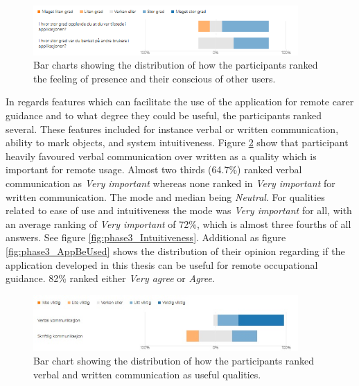 \begin{figure}[H]
  \centering
   \captionsetup{width=.8\linewidth}
    \includegraphics[width=0.9\textwidth]{fig/phase_3/survey/socialPrecense.png}
 \caption{Bar charts showing the distribution of how the participants ranked the feeling of presence and their 
conscious of other users.}
\label{fig:phase3_socialPresence}
\end{figure}


In regards features which can facilitate the use of the application for remote carer guidance and to what degree they could be useful, the participants ranked several. These features included for instance verbal or written communication, ability to mark objects, and system intuitiveness. Figure \ref{fig:phase3_VerbalWritten} show that participant heavily favoured verbal communication over written as a quality which is important for remote usage. Almost two thirds (64.7\%) ranked verbal communication as \textit{Very important} whereas none ranked in \textit{Very important} for written communication. The mode and median being \textit{Neutral}.
For qualities related to ease of use and intuitiveness the mode was \textit{Very important} for all, with an average ranking of \textit{Very important} of 72\%, which is almost three fourths of all answers.  See figure \ref{fig:phase3_Intuitiveness}.   
Additional as figure \ref{fig:phase3_AppBeUsed} shows the distribution of their opinion regarding if the application developed in this thesis can be useful for remote occupational guidance. 82\% ranked either \textit{Very agree} or \textit{Agree}.


\begin{figure}[H]
  \centering
   \captionsetup{width=.8\linewidth}
    \includegraphics[width=0.9\textwidth]{fig/phase_3/survey/RemoteVerbalWritten.jpg}
 \caption{Bar chart showing the distribution of how the participants ranked verbal and written communication as useful qualities.}
\label{fig:phase3_VerbalWritten}
\end{figure}

